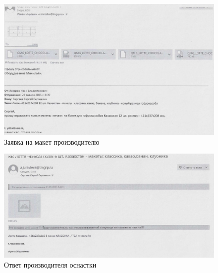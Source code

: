 \clearpage



\begin{figure}
\begin{center}
 \includegraphics[height=0.4\textheight, keepaspectratio]{Pics/II.8.3.jpg}
\end{center}
 \caption{Заявка на макет производителю}
 \label{pic:II.8.3}
\end{figure}

\begin{figure}
\begin{center}
 \includegraphics[height=0.3\textheight, keepaspectratio]{Pics/II.8.4.jpg}
\end{center}
 \caption{Ответ производителя оснастки}
 \label{pic:II.8.4}
\end{figure}


